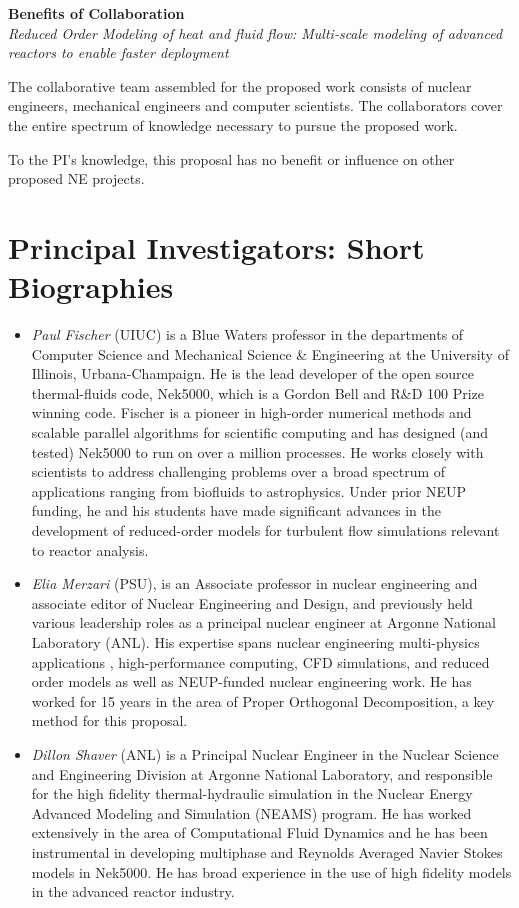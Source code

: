 
\parindent 0in
\parskip 0.1in

\begin{center}
{\bf Benefits of Collaboration } \\
{\it  Reduced Order Modeling of heat and fluid flow: Multi-scale modeling of advanced reactors to enable faster deployment }
\end{center}

The collaborative team assembled for the proposed work consists of nuclear
engineers, mechanical engineers and computer scientists.  The collaborators
cover the entire spectrum of knowledge necessary to pursue the proposed work.

To the PI's knowledge,
this proposal has no benefit or influence on other proposed NE projects.

\section{Principal Investigators: Short Biographies}
\begin{itemize}
\item \textit{Paul Fischer} (UIUC) is a Blue Waters professor in the
departments of Computer Science and Mechanical Science \& Engineering
at the University of Illinois, Urbana-Champaign.  He is the lead developer
of the open source thermal-fluids code, Nek5000, which is a Gordon Bell
and R\&D 100 Prize winning code.  Fischer is a pioneer in high-order
numerical methods and scalable parallel algorithms for scientific computing
and has designed (and tested) Nek5000 to run on over a million processes.
He works closely with scientists to address challenging problems over a broad
spectrum of applications ranging from biofluids to astrophysics.
Under prior NEUP funding, he and his students have made significant advances
in the development of reduced-order models for turbulent flow simulations
relevant to reactor analysis.



\item \textit{Elia Merzari} (PSU), is an Associate professor in nuclear
engineering and associate editor of Nuclear Engineering and Design, and
previously held various leadership roles as a principal nuclear engineer at
Argonne National Laboratory (ANL). His expertise spans nuclear engineering
multi-physics applications , high-performance computing, CFD simulations, and
reduced order models as well as NEUP-funded nuclear engineering work.  He has
worked for 15 years in the area of Proper Orthogonal Decomposition, a key
method for this proposal.

\item \textit{Dillon Shaver} (ANL) is a Principal Nuclear Engineer in the
Nuclear Science and Engineering Division at Argonne National Laboratory, and
responsible for the high fidelity thermal-hydraulic simulation in the Nuclear
Energy Advanced Modeling and Simulation (NEAMS) program. He has worked
extensively in the area of Computational Fluid Dynamics and he has been
instrumental in developing multiphase and Reynolds Averaged Navier Stokes
models in Nek5000. He has broad experience in the use of high fidelity models
in the advanced reactor industry.

\end{itemize}
